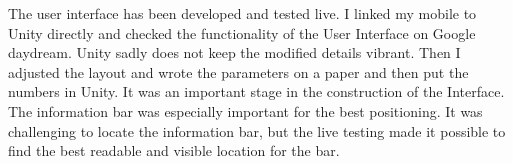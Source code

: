 The user interface has been developed and tested live. I linked my mobile to Unity directly and checked the functionality of the User Interface on Google daydream. Unity sadly does not keep the modified details vibrant. Then I adjusted the layout and wrote the parameters on a paper and then put the numbers in Unity. It was an important stage in the construction of the Interface. The information bar was especially important for the best positioning. It was challenging to locate the information bar, but the live testing made it possible to find the best readable and visible location for the bar.  